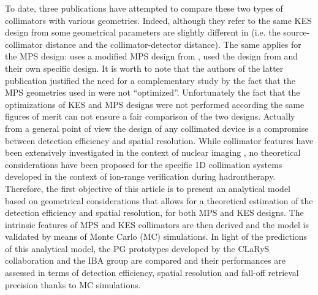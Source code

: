 \documentclass[a4paper,english,12pt]{article}
\newcommand{\qq}[1]{\enquote{#1}}
\begin{document}
To date, three publications \citep{Smeets2016, Lin2017, Park2017} have attempted to compare these two types of collimators with various geometries. Indeed, although they refer to the same KES design from \citep{Perali2014} some geometrical parameters are slightly different in \citep{Lin2017, Park2017} (i.e. the source-collimator distance and the collimator-detector distance). The same applies for the MPS design: \cite{Smeets2016} uses a modified MPS design from \cite{Pinto2014a}, \cite{Lin2017} used the design from \cite{Gueth2013} and \cite{Park2017} their own specific design. It is worth to note that the authors of the latter publication justified the need for a complementary study by the fact that the MPS geometries used in \cite{Smeets2016, Lin2017} were not \qq{optimized}. 
Unfortunately the fact that the optimizations of KES and MPS designs were not performed according the same figures of merit can not ensure a fair comparison of the two designs. Actually from a general point of view the design of any collimated device is a compromise between detection efficiency and spatial resolution. While collimator features have been extensively investigated in the context of nuclear imaging \citep{Gunter2004}, no theoretical considerations have been proposed for the specific 1D collimation systems developed in the context of ion-range verification during hadrontherapy.
Therefore, the first objective of this article is to present an analytical model based on geometrical considerations that allows for a theoretical estimation of the detection efficiency and spatial resolution, for both MPS and KES designs. The intrinsic features of MPS and KES collimators are then derived and the model is validated by means of Monte Carlo (MC) simulations. In light of the predictions of this analytical model, the PG prototypes developed by the CLaRyS collaboration \citep{Pinto2014a, Krimmer2015} and the IBA group \citep{Perali2014} are compared and their performances are assessed in terms of detection efficiency, spatial resolution and fall-off retrieval precision thanks to MC simulations.

\end{document}
